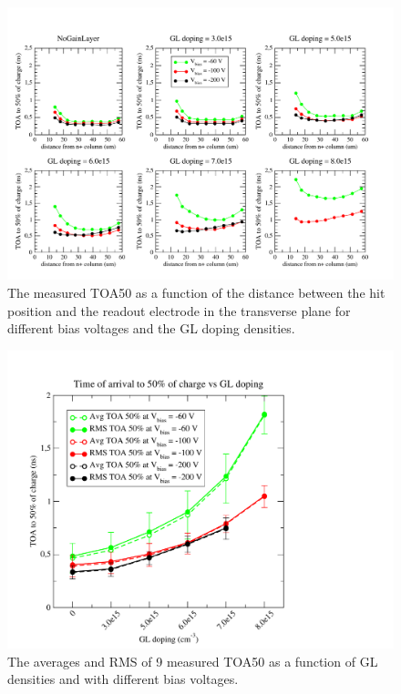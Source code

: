 \documentclass[aps,pt14,superscriptaddress,showpacs,floatfix,nofootinbib]{revtex4}
\begin{document}
\begin{figure}[hbtp]
\begin{center}
\includegraphics[width=0.5\textheight,keepaspectratio]{figures/MIP_Pulse_TOA50.pdf}
\caption{The measured TOA50 as a function of the distance between the hit position and the readout electrode in the
transverse plane for different bias voltages and the GL doping densities.~\label{fig:toamean}} 
\end{center}
\end{figure}

\begin{figure}[hbtp]
\begin{center}
\includegraphics[width=0.5\textheight,keepaspectratio]{figures/ToA_vs_GLdoping.pdf}
\caption{The averages and RMS of 9 measured TOA50 as a function of GL densities and with different bias 
voltages.~\label{fig:toarms}}
\end{center}
\end{figure}
\end{document}
